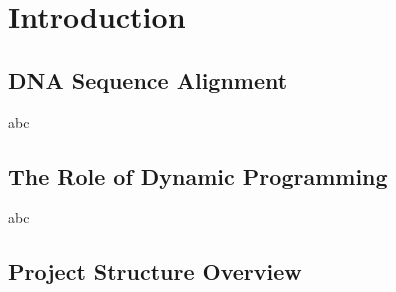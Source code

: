 \section{Introduction}

\subsection{DNA Sequence Alignment}

abc

\subsection{The Role of Dynamic Programming}

abc

\subsection{Project Structure Overview}
